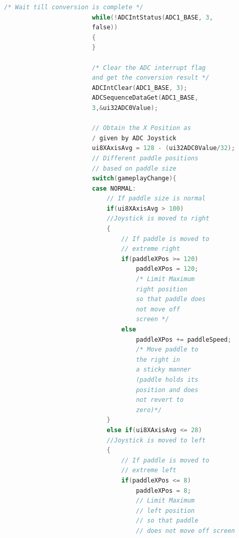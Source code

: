 \documentclass{article}
\begin{document}
\begin{lstlisting}[basicstyle = \small, language = C]
                        /* Wait till conversion is complete */
                        while(!ADCIntStatus(ADC1_BASE, 3, 
                        false))
                        {
                        }

                        /* Clear the ADC interrupt flag 
                        and get the conversion result */
                        ADCIntClear(ADC1_BASE, 3);
                        ADCSequenceDataGet(ADC1_BASE, 
                        3,&ui32ADC0Value);

                        // Obtain the X Position as 
                        / given by ADC Joystick
                        ui8XAxisAvg = 128 - (ui32ADC0Value/32);
                        // Different paddle positions 
                        // based on paddle size
                        switch(gameplayChange){
                        case NORMAL:
                            // If paddle size is normal
                            if(ui8XAxisAvg > 100) 
                            //Joystick is moved to right
                            {
                                // If paddle is moved to 
                                // extreme right
                                if(paddleXPos >= 120)
                                    paddleXPos = 120; 
                                    /* Limit Maximum 
                                    right position 
                                    so that paddle does 
                                    not move off 
                                    screen */
                                else
                                    paddleXPos += paddleSpeed; 
                                    /* Move paddle to 
                                    the right in
                                    a sticky manner
                                    (paddle holds its 
                                    position and does 
                                    not revert to 
                                    zero)*/
                            }
                            else if(ui8XAxisAvg <= 28) 
                            //Joystick is moved to left
                            {
                                // If paddle is moved to 
                                // extreme left
                                if(paddleXPos <= 8)
                                    paddleXPos = 8; 
                                    // Limit Maximum 
                                    // left position 
                                    // so that paddle 
                                    // does not move off screen

\end{lstlisting}
\end{document}

